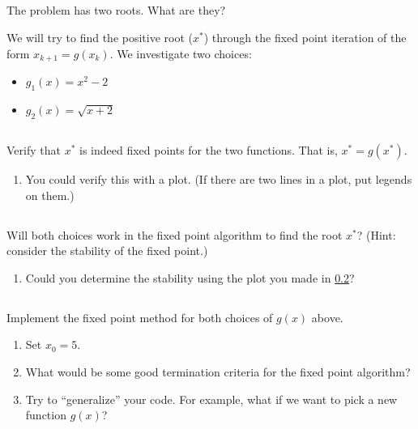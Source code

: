 \documentclass[11pt,letterpaper]{report}
\begin{document}
\subsection{}
The problem has two roots. What are they? 

\vspace{1cm}
We will try to find the positive root ($x^*$) through the fixed point iteration of the form $x_{k+1} = g(x_k)$. We investigate two choices:
\begin{itemize}
    \item $g_1(x) = x^2-2$
    \item $g_2(x) = \sqrt{x+2}$
\end{itemize}

\subsection{}\label{sec:2.1c}
Verify that $x^*$ is indeed fixed points for the two functions. That is, $x^* = g(x^*)$. 
\begin{enumerate}
    \item You could verify this with a plot. (If there are two lines in a plot, put legends on them.)
\end{enumerate}

\subsection{}
Will both choices work in the fixed point algorithm to find the root $x^*$? (Hint: consider the stability of the fixed point.)
\begin{enumerate}
    \item Could you determine the stability using the plot you made in \ref{sec:2.1c}?
\end{enumerate}

\subsection{}
Implement the fixed point method for both choices of $g(x)$ above. 
\begin{enumerate}
    \item Set $x_0 = 5$.
    \item What would be some good termination criteria for the fixed point algorithm?
    \item Try to ``generalize'' your code. For example, what if we want to pick a new function $g(x)$?
\end{enumerate}
\end{document}

